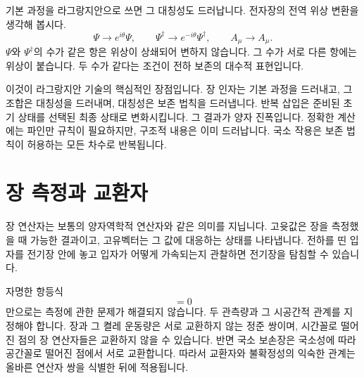 기본 과정을 라그랑지안으로 쓰면 그 대칭성도 드러납니다. 전자장의 전역 위상 변환을 생각해 봅시다.
\begin{equation}
\Psi\longrightarrow e^{i\theta}\Psi,
\qquad
\Psi^\dagger\longrightarrow e^{-i\theta}\Psi^\dagger,
\qquad
A_\mu\longrightarrow A_\mu.
\end{equation}
\(\Psi\)와 \(\Psi^\dagger\)의 수가 같은 항은 위상이 상쇄되어 변하지 않습니다. 그 수가 서로 다른 항에는 위상이 붙습니다. 두 수가 같다는 조건이 전하 보존의 대수적 표현입니다.

이것이 라그랑지안 기술의 핵심적인 장점입니다. 장 인자는 기본 과정을 드러내고, 그 조합은 대칭성을 드러내며, 대칭성은 보존 법칙을 드러냅니다. 반복 삽입은 준비된 초기 상태를 선택된 최종 상태로 변화시킵니다. 그 결과가 양자 진폭입니다. 정확한 계산에는 파인만 규칙이 필요하지만, 구조적 내용은 이미 드러납니다. 국소 작용은 보존 법칙이 허용하는 모든 차수로 반복됩니다.

\section{장 측정과 교환자}

장 연산자는 보통의 양자역학적 연산자와 같은 의미를 지닙니다. 고윳값은 장을 측정했을 때 가능한 결과이고, 고유벡터는 그 값에 대응하는 상태를 나타냅니다. 전하를 띤 입자를 전기장 안에 놓고 입자가 어떻게 가속되는지 관찰하면 전기장을 탐침할 수 있습니다.

\begin{classroomqa}
\end{classroomqa}

자명한 항등식
\begin{equation}
[\phi(x),\phi(x)]=0
\end{equation}
만으로는 측정에 관한 문제가 해결되지 않습니다. 두 관측량과 그 시공간적 관계를 지정해야 합니다. 장과 그 켤레 운동량은 서로 교환하지 않는 정준 쌍이며, 시간꼴로 떨어진 점의 장 연산자들은 교환하지 않을 수 있습니다. 반면 국소 보손장은 국소성에 따라 공간꼴로 떨어진 점에서 서로 교환합니다. 따라서 교환자와 불확정성의 익숙한 관계는 올바른 연산자 쌍을 식별한 뒤에 적용됩니다.

